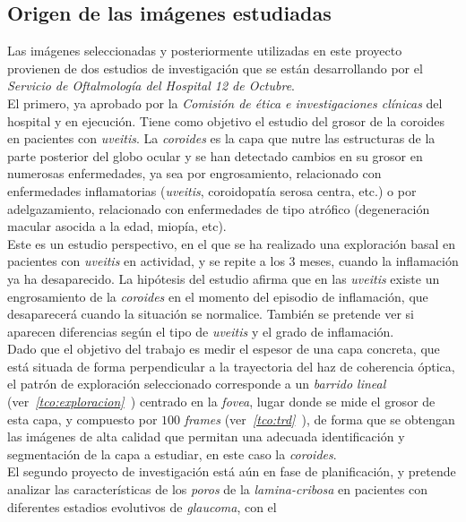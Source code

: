 \subsection{Origen de las imágenes estudiadas}
Las imágenes seleccionadas y posteriormente utilizadas en este
proyecto provienen de dos estudios de investigación que se están
desarrollando por el \emph{Servicio de Oftalmología del Hospital 12 de
  Octubre}.\\
El primero, ya aprobado por la \emph{Comisión de ética e
  investigaciones clínicas} del hospital y en ejecución. Tiene como
objetivo el estudio del grosor de la \gls{coroides} en pacientes con
\emph{\gls{uveitis}}. La \emph{coroides} es la capa que nutre las
estructuras de la parte posterior del globo ocular y se han detectado
cambios en su grosor en numerosas enfermedades, ya sea por
engrosamiento, relacionado con enfermedades inflamatorias
(\emph{\gls{uveitis}}, coroidopatía serosa centra, etc.) o por
adelgazamiento, relacionado con enfermedades de tipo atrófico
(degeneración macular asocida a la edad, miopía, etc).\\
Este es un estudio perspectivo, en el que se ha realizado una
exploración basal en pacientes con \emph{\gls{uveitis}} en actividad,
y se repite a los 3 meses, cuando la inflamación ya ha
desaparecido. La hipótesis del estudio afirma que en las
\emph{\gls{uveitis}} existe un engrosamiento de la
\emph{\gls{coroides}} en el momento del episodio de inflamación, que
desaparecerá cuando la situación se normalice. También se pretende ver
si aparecen diferencias según el tipo de \emph{\gls{uveitis}} y el
grado de inflamación.\\
Dado que el objetivo del trabajo es medir el espesor de una capa
concreta, que está situada de forma perpendicular a la trayectoria del
haz de coherencia óptica, el patrón de exploración seleccionado
corresponde a un \emph{barrido lineal}
(ver\emph{~\ref{tco:exploracion}~}) centrado
en la \emph{\gls{fovea}}, lugar donde se mide el grosor de esta capa,
y compuesto por $100$ \emph{frames}
(ver\emph{~\ref{tco:trd}~}), de forma que se obtengan
las imágenes de alta calidad que permitan una adecuada identificación
y segmentación de la capa a
estudiar, en este caso la \emph{\gls{coroides}}.\\
El segundo proyecto de investigación está aún en fase de
planificación, y pretende analizar las características de los
\emph{poros} de la \emph{\gls{lamina-cribosa}} en pacientes con
diferentes estadios evolutivos de \emph{\gls{glaucoma}}, con el
